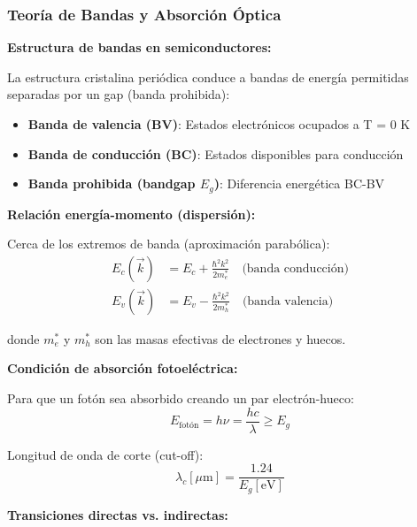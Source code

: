 \documentclass[11pt,a4paper]{article}
\begin{document}
\subsubsection{Teoría de Bandas y Absorción Óptica}

\textbf{Estructura de bandas en semiconductores:}

La estructura cristalina periódica conduce a bandas de energía permitidas separadas por un gap (banda prohibida):

\begin{itemize}
    \item \textbf{Banda de valencia (BV)}: Estados electrónicos ocupados a T = 0 K
    \item \textbf{Banda de conducción (BC)}: Estados disponibles para conducción
    \item \textbf{Banda prohibida (bandgap $E_g$)}: Diferencia energética BC-BV
\end{itemize}

\textbf{Relación energía-momento (dispersión):}

Cerca de los extremos de banda (aproximación parabólica):
\begin{align}
    E_c(\vec{k}) &= E_c + \frac{\hbar^2k^2}{2m_e^*} \quad \text{(banda conducción)}\\
    E_v(\vec{k}) &= E_v - \frac{\hbar^2k^2}{2m_h^*} \quad \text{(banda valencia)}
\end{align}

donde $m_e^*$ y $m_h^*$ son las masas efectivas de electrones y huecos.

\textbf{Condición de absorción fotoeléctrica:}

Para que un fotón sea absorbido creando un par electrón-hueco:
\begin{equation}
    E_{\text{fotón}} = h\nu = \frac{hc}{\lambda} \geq E_g
\end{equation}

Longitud de onda de corte (cut-off):
\begin{equation}
    \lambda_c [\mu\text{m}] = \frac{1.24}{E_g [\text{eV}]}
\end{equation}

\textbf{Transiciones directas vs. indirectas:}
\end{document}
